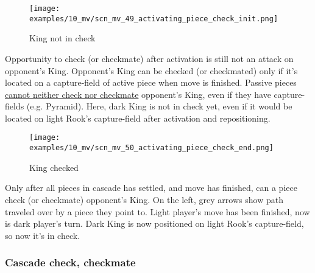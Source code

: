 \vspace*{-0.7\baselineskip}
\noindent
\begin{wrapfigure}[15]{l}{0.4\textwidth}
\centering
\texttt{[image: examples/10\_mv/scn\_mv\_49\_activating\_piece\_check\_init.png]}
\vspace*{-1.4\baselineskip}
\caption{King not in check}
\label{fig:scn_mv_49_activating_piece_check_init}
\end{wrapfigure}
Opportunity to check (or checkmate) after activation is still not
an attack on opponent's King.\newline
\indent
Opponent's King can be checked (or checkmated) only if it's located
on a capture-field of active piece when move is finished.\newline
\indent
Passive pieces
\hyperref[fig:scn_ma_19_pyramid_vs_king]{cannot neither check nor checkmate}
opponent's King, even if they have capture-fields (e.g. Pyramid).\newline
\indent
Here, dark King is not in check yet, even if it would be located on light
Rook's capture-field after activation and repositioning.

\noindent
\begin{wrapfigure}[11]{l}{0.4\textwidth}
\centering
\texttt{[image: examples/10\_mv/scn\_mv\_50\_activating\_piece\_check\_end.png]}
\vspace*{-1.4\baselineskip}
\caption{King checked}
\label{fig:scn_mv_50_activating_piece_check_end}
\end{wrapfigure}
Only after all pieces in cascade has settled, and move has finished, can a piece
check (or checkmate) opponent's King.\newline
\indent
On the left, grey arrows show path traveled over by a piece they point to.
Light player's move has been finished, now is dark player's turn. Dark King
is now positioned on light Rook's capture-field, so now it's in check.

\clearpage %

\subsubsection*{Cascade check, checkmate}
\label{sec:Miranda's veil/Wave/Cascading Waves/Cascade check, checkmate}

